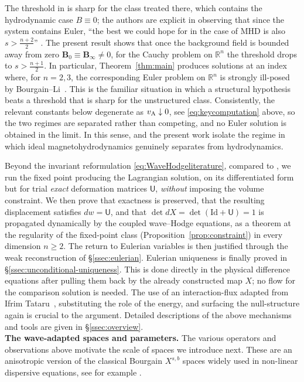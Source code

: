 \documentclass[11pt,reqno]{amsart}
\theoremstyle{plain}
\theoremstyle{definition}
\theoremstyle{remark}
\numberwithin{equation}{section}
\newcommand{\Ufield}{\mathsf U}
\newcommand{\Bzero}{\mathbf B_0}
\newcommand{\Binf}{\mathbf B_\infty}
\newcommand{\Real}{\mathbb R}
\newcommand{\Rn}{\Real^n}
\begin{document}
The threshold in \cite{ifrim} is sharp for the class treated there, which
contains the hydrodynamic case $B\equiv0$; the authors are explicit in observing that since the system contains Euler, ``the best we
could hope for in the case of MHD is also $s>\frac{n+2}{2}$'' \cite[p.~5]{ifrim}. The present result shows that once the background field is
bounded away from zero $\Bzero\equiv\Binf\ne0$, for the Cauchy problem
on $\Rn$ the threshold drops to $s>\frac{n+1}2$. In particular, Theorem~\ref{thm:main} produces solutions at an
index where, for $n=2,3$, the corresponding Euler problem on $\Rn$ is strongly
ill-posed by Bourgain--Li~\cite{BourgainLi2015Invent,BourgainLi2021IMRN}. This is the familiar situation in which a
structural hypothesis beats a threshold that is sharp for the unstructured
class. Consistently, the relevant constants below degenerate as $v_{\rm A}\downarrow0$, see \eqref{eq:keycomputation} above, so the two
regimes are separated rather than competing, and no Euler solution is obtained
in the limit. In this sense, \cite{Zhang2024} and the present work isolate the regime in which ideal
magnetohydrodynamics genuinely separates from hydrodynamics.

Beyond the invariant reformulation \eqref{eq:WaveHodgeliterature}, compared to \cite{Zhang2024}, we run the fixed point producing the Lagrangian solution, on its differentiated form but for trial \emph{exact} deformation
matrices $\Ufield$, \emph{without} imposing the volume constraint. We then prove that exactness is preserved, that the resulting displacement
satisfies $dw=\Ufield$, and that $\det d X=\det(\mathrm{Id}+\Ufield)=1$ is propagated dynamically by the coupled
wave--Hodge equations, as a theorem at the regularity of the
fixed-point class (Proposition~\ref{prop:constraint}) in every dimension $n\ge2$. The return
to Eulerian variables is then justified through the weak reconstruction of \S\ref{ssec:eulerian}. Eulerian uniqueness is finally proved in \S\ref{ssec:unconditional-uniqueness}. This is done directly
in the physical difference equations after pulling them back by the
already constructed map $X$; no flow for the comparison solution is needed. The use of an interaction-flux adapted from Ifrim Tataru~\cite{IfrimTataru2025}, substituting the role of the energy, and surfacing the null-structure again is crucial to the argument. Detailed descriptions of the above mechanisms and tools are given in \S\ref{ssec:overview}.\\

\textbf{The wave-adapted spaces and parameters.} The various operators and observations above motivate the scale of spaces we introduce next. These are an anisotropic version of the classical Bourgain $X^{s,b}$ spaces widely used in non-linear dispersive equations, see for example \cite{Tao2006Dispersive}.  
\end{document}
